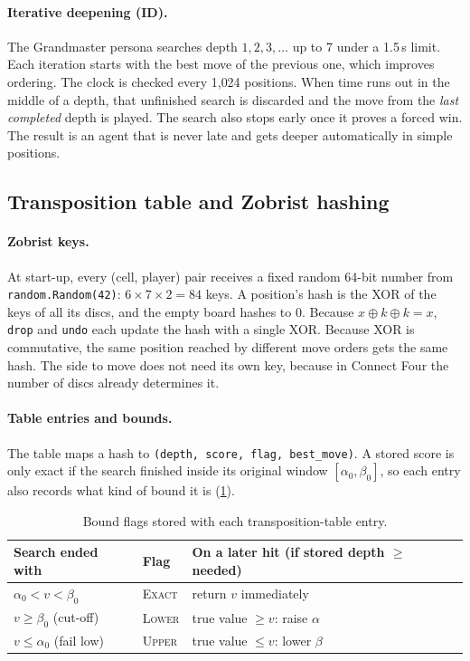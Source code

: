 \documentclass[11pt,a4paper]{article}
\newcommand{\code}[1]{\texttt{\small #1}}
\begin{document}
\paragraph{Iterative deepening (ID).} The Grandmaster persona searches depth $1,2,3,\dots$ up to 7 under a 1.5\,s limit. Each iteration starts with the best move of the previous one, which improves ordering. The clock is checked every 1{,}024 positions. When time runs out in the middle of a depth, that unfinished search is discarded and the move from the \emph{last completed} depth is played. The search also stops early once it proves a forced win. The result is an agent that is never late and gets deeper automatically in simple positions.

\subsection{Transposition table and Zobrist hashing}\label{sec:tt}
\paragraph{Zobrist keys.} At start-up, every (cell, player) pair receives a fixed random 64-bit number from \code{random.Random(42)}: $6\times7\times2 = 84$ keys. A position's hash is the XOR of the keys of all its discs, and the empty board hashes to 0. Because $x \oplus k \oplus k = x$, \code{drop} and \code{undo} each update the hash with a single XOR. Because XOR is commutative, the same position reached by different move orders gets the same hash. The side to move does not need its own key, because in Connect Four the number of discs already determines it.

\paragraph{Table entries and bounds.} The table maps a hash to \code{(depth, score, flag, best\_move)}. A stored score is only exact if the search finished inside its original window $[\alpha_0,\beta_0]$, so each entry also records what kind of bound it is (\cref{tab:bounds}).

\begin{table}[ht]
\centering\small
\caption{Bound flags stored with each transposition-table entry.}\label{tab:bounds}
\begin{tabular}{@{}lll@{}}
\toprule
\textbf{Search ended with} & \textbf{Flag} & \textbf{On a later hit (if stored depth $\ge$ needed)} \\
\midrule
$\alpha_0 < v < \beta_0$ & \textsc{Exact} & return $v$ immediately \\
$v \ge \beta_0$ (cut-off) & \textsc{Lower} & true value $\ge v$: raise $\alpha$ \\
$v \le \alpha_0$ (fail low) & \textsc{Upper} & true value $\le v$: lower $\beta$ \\
\bottomrule
\end{tabular}
\end{table}
\end{document}
